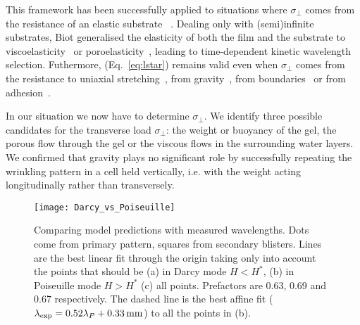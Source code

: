 \documentclass[twocolumn,superscriptaddress,showpacs,preprintnumbers,
amsmath,amssymb,prl]{revtex4-1}
\begin{document}
This framework has been successfully applied to situations where $\sigma_{\perp}$ comes from the resistance of an elastic substrate ~\cite{Gough1940, Bijlaard1946}. Dealing only with (semi)infinite substrates, Biot generalised the elasticity of both the film and the substrate to viscoelasticity~\cite{Biot1957} or poroelasticity~\cite{Biot1964}, leading to time-dependent kinetic wavelength selection. Futhermore, (Eq.~\ref{eq:lstar}) remains valid even when $\sigma_{\perp}$ comes from the resistance to uniaxial stretching~\cite{Cerda2003}, from gravity~\cite{Smoluchowski1910, Kolinski2009, Vella2009, Pineirua2013, Lucantonio2013}, from boundaries~\cite{Vandeparre2011a, Li2013} or from adhesion~\cite{Vella2009a}.

In our situation we now have to determine $\sigma_\perp$. We identify three possible candidates for the transverse load $\sigma_\perp$: the weight or buoyancy of the gel, the porous flow through the gel or the viscous flows in the surrounding water layers. We confirmed that gravity plays no significant role by successfully repeating the wrinkling pattern in a cell held vertically, i.e. with the weight acting longitudinally rather than transversely.


\begin{figure*}
	\texttt{[image: Darcy\_vs\_Poiseuille]}
	\caption{Comparing model predictions with measured wavelengths. Dots come from primary pattern, squares from secondary blisters. Lines are the best linear fit through the origin taking only into account the points that should be (a) in Darcy mode $H<H^*$, (b) in Poiseuille mode $H>H^*$ (c) all points. Prefactors are 0.63, 0.69 and 0.67 respectively. The dashed line is the best affine fit ($\lambda_{\rm exp}=0.52\lambda_{P}+\SI{0.33}{\milli\metre}$) to all the points in (b).}
	\label{fig:DarcyPoiseuille}
\end{figure*}
\end{document}
